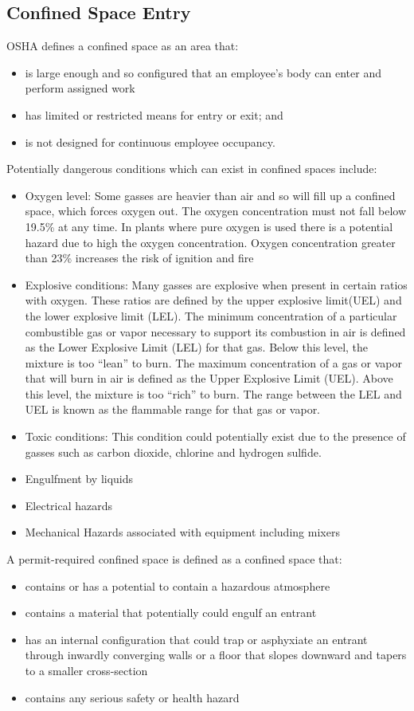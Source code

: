 \subsection{Confined Space Entry}
OSHA defines a confined space as an area that:
\begin{itemize} 
\item is large enough and so configured that an employee's body can enter and perform assigned work
\item has limited or restricted means for entry or exit; and
\item is not designed for continuous employee occupancy.
\end{itemize}
Potentially dangerous conditions which can exist in confined spaces include: 
\begin{itemize}
\item Oxygen level: Some gasses are heavier than air and so will fill up a confined space, which forces oxygen out.  The oxygen concentration must not fall below 19.5\% at any time.  In plants where pure oxygen is used there is a potential hazard due to high the oxygen concentration.  Oxygen concentration greater than 23\% increases the risk of ignition and fire
\item Explosive conditions:  Many gasses are explosive when present in certain ratios with oxygen. These ratios are defined by the upper explosive limit(UEL) and the lower explosive limit (LEL).  The minimum concentration of a particular combustible gas or vapor necessary to support its combustion in air is defined as the Lower Explosive Limit (LEL) for that gas. Below this level, the mixture is too “lean” to burn. The maximum concentration of a gas
or vapor that will burn in air is defined as the Upper Explosive Limit (UEL). Above this level, the mixture is too “rich” to burn.  The range between the LEL and UEL is known as the flammable range for that gas or vapor.  
\item Toxic conditions:  This condition could potentially exist due to the presence of gasses such as carbon dioxide, chlorine and hydrogen sulfide.
\item Engulfment by liquids
\item Electrical hazards
\item Mechanical Hazards associated with equipment including mixers
\end{itemize}

A permit-required confined space is defined as a confined space that:
\begin{itemize} 
\item contains or has a potential to contain a hazardous atmosphere
\item contains a material that potentially could engulf an entrant
\item has an internal configuration that could trap or asphyxiate an entrant through inwardly converging walls or a floor that slopes downward and tapers to a smaller cross-section
\item contains any serious safety or health hazard
\end{itemize}





